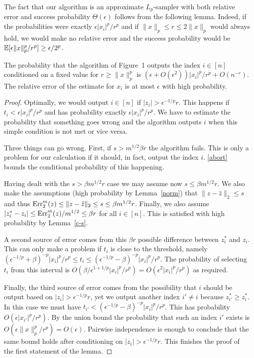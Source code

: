 The fact that our algorithm is an approximate $L_p$-sampler with both relative
error and success probability $\Theta(\epsilon)$ follows from the following
lemma. Indeed, if the probabilities were exactly $\epsilon|x_i|^p/r^p$ and
if $\|x\|_p\le r\le2\|x\|_p$ would always hold, we
would make no relative error and the success probability would be
$\operatorname*{\mathbb{E}}[\epsilon\|x\|_p^p/r^p]\ge\epsilon/2^p$.

\begin{lemma} \label{lps}
The probability that the algorithm of Figure~1 outputs the index
$i\in[n]$ conditioned on a fixed value for $r\ge\|x\|_p^p$ is
$(\epsilon+O(\epsilon^2))|x_i|^p/r^p+O(n^{-c})$. The
relative error of the estimate for $x_i$ is at most $\epsilon$ with high
probability.
\end{lemma}

\begin{proof} Optimally, we would output $i\in[n]$ if
$|z_i|>\epsilon^{-1/p}r$. This happens if $t_i<\epsilon|x_i|^p/r^p$ and
has probability exactly $\epsilon|x_i|^p/r^p$. We have to estimate the
probability that something goes wrong and the algorithm outputs $i$ when this
simple condition is not met or vice versa.

Three things can go wrong. First, if $s>m^{1/2}\beta r$ the algorithm
fails. This is only a problem for our calculation if it should, in fact,
output the index $i$. \autoref{abort} bounds the conditional
probability of this happening.

Having dealt with the $s>\beta m^{1/2}r$ case we may assume now $s\le\beta
m^{1/2} r$. We also make the assumptions (high probability by
Lemma~\ref{norm}) that
$\|z-\hat z\|_2\le s$ and thus $\operatorname{Err}_2^m(z)\le\|z-\hat z\|_2\le s\le\beta
m^{1/2}r$. Finally, we also assume $|z^*_i-z_i|\le\operatorname{Err}_2^m(z)/m^{1/2}\le\beta
r$ for all $i\in[n]$. This is satisfied with high probability by
Lemma~\ref{c-s}.

A second source of error comes from this $\beta r$ possible difference
between $z^*_i$ and $z_i$. This can only make a problem if $t_i$ is
close to the threshold, namely $(\epsilon^{-1/p}+\beta)^{-p}|x_i|^p/r^p\le
t_i\le (\epsilon^{-1/p}-\beta)^{-p}|x_i|^p/r^p$. The probability of selecting
$t_i$ from this interval is
$O(\beta/\epsilon^{1+1/p}|x_i|^p/r^p)=O(\epsilon^2|x_i|^p/r^p)$ as required.

Finally, the third source of error comes from the possibility that $i$ should
be output based on $|z_i|>\epsilon^{-1/p}r$, yet we output another index
$i'\ne i$ because $z^*_{i'}\ge z^*_i$. In this case we
must have $t_{i'}<(\epsilon^{-1/p}-\beta)^{-p}|x_i|^p/r^p$. This has
probability $O(\epsilon|x_{i'}|^p/r^p)$. By the union bound the probability
that such an index $i'$ exists is
$O(\epsilon\|x\|_p^p/r^p)=O(\epsilon)$. Pairwise independence is enough to
conclude that the same bound holds after conditioning on
$|z_i|>\epsilon^{-1/p}r$. This finishes the proof of the first statement of
the lemma.


\end{proof}
